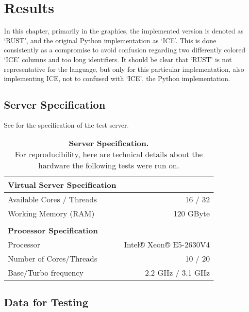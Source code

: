 \chapter{Results}\label{chap:results}

In this chapter, primarily in the graphics, the implemented version is denoted
as `RUST', and the original Python implementation as `ICE'. This is done
consistently as a compromise to avoid confusion regarding two differently
colored `ICE' columns and too long identifiers. It should be clear that `RUST'
is not representative for the language, but only for this particular
implementation, also implementing ICE, not to confused with `ICE', the Python
implementation.

\section{Server Specification}\label{sec:specs}

See  for the specification of the test server.

\begin{table}[ht]
    \begin{tabular}{@{}lr@{}}
        \textbf{Virtual Server Specification} & \\
        \midrule
        Available Cores / Threads & 16 / 32 \\
        Working Memory (RAM) & 120 GByte \\ \\
        \textbf{Processor Specification} & \\
        \midrule
        Processor & Intel® Xeon® E5-2630V4\footnotemark \\
        Number of Cores/Threads & 10 / 20 \\
        Base/Turbo frequency & 2.2 GHz / 3.1 GHz \\
    \end{tabular}
    \caption[Server Specification]
    {\textbf{Server Specification.} \\
    For reproducibility, here are technical details about the hardware the
    following tests were run on.}
    \label{tab:specs}
\end{table}



\newpage
\section{Data for Testing}\label{sec:data}

